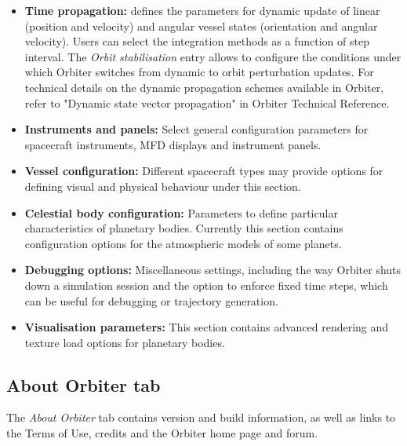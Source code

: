 \documentclass[Orbiter User Manual.tex]{subfiles}
\begin{document}
\begin{itemize}
\item \textbf{Time propagation:} defines the parameters for dynamic update of linear (position and velocity) and angular vessel states (orientation and angular velocity). Users can select the integration methods as a function of step interval. The \textit{Orbit stabilisation} entry allows to configure the conditions under which Orbiter switches from dynamic to orbit perturbation updates. For technical details on the dynamic propagation schemes available in Orbiter, refer to "Dynamic state vector propagation" in Orbiter Technical Reference.
\item \textbf{Instruments and panels:} Select general configuration parameters for spacecraft instruments, MFD displays and instrument panels.
\item \textbf{Vessel configuration:} Different spacecraft types may provide options for defining visual and physical behaviour under this section.
\item \textbf{Celestial body configuration:} Parameters to define particular characteristics of planetary bodies. Currently this section contains configuration options for the atmospheric models of some planets.
\item \textbf{Debugging options:} Miscellaneous settings, including the way Orbiter shuts down a simulation session and the option to enforce fixed time steps, which can be useful for debugging or trajectory generation.
\item \textbf{Visualisation parameters:} This section contains advanced rendering and texture load options for planetary bodies.
\end{itemize}


\subsection{About Orbiter tab}
The \textit{About Orbiter} tab contains version and build information, as well as links to the Terms of Use, credits and the Orbiter home page and forum.

\begin{figure}[H]
	\centering
\end{figure}
\end{document}
